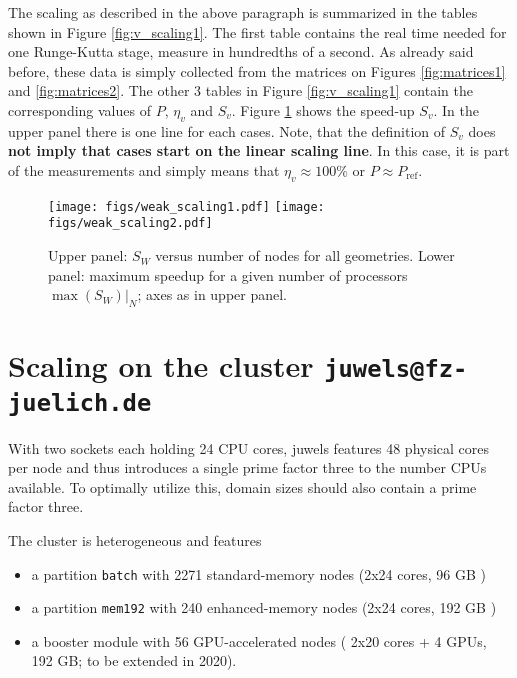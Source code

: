The scaling as described in the above paragraph is summarized in the tables
shown in Figure \ref{fig:v_scaling1}. The first table contains the real time
needed for one Runge-Kutta stage, measure in hundredths of a second. As already
said before, these data is simply collected from the matrices on
Figures \ref{fig:matrices1} and \ref{fig:matrices2}. The other 3 tables in
Figure \ref{fig:v_scaling1} contain the corresponding values of $P$, $\eta_v$
and $S_v$.  Figure \ref{fig:v_scaling2} shows the speed-up $S_v$. In the upper
panel there is one line for each cases.  Note, that the definition of $S_v$
does \textbf{not imply that cases start on the linear scaling line}. In this
case, it is part of the measurements and simply means that $\eta_v\approx 100\%$
or $P\approx P_\mathrm{ref}$.

\begin{figure}
  \begin{centering}
  \texttt{[image: figs/weak\_scaling1.pdf]}%
  \texttt{[image: figs/weak\_scaling2.pdf]}\\
  \end{centering}
  \caption{Upper panel: $S_W$ versus number of nodes for all geometries. Lower
    panel: maximum speedup for a given number of processors $\max(S_W)|_N$; axes
    as in upper panel.  }
  \label{fig:v_scaling2} 
\end{figure}


\section{Scaling on the cluster \texttt{juwels@fz-juelich.de}} 

With two sockets each holding 24 CPU cores, juwels features 48 physical cores per node and thus 
introduces a single prime factor three to the number CPUs available. To optimally utilize this, 
domain sizes should also contain a prime factor three. 

The cluster is heterogeneous and features
\begin{itemize} 
  \item[(1)] a partition \texttt{batch} with 2271 standard-memory nodes (2x24 cores, 96 GB )
  \item[(2)] a partition \texttt{mem192} with 240 enhanced-memory nodes (2x24 cores, 192 GB )
  \item[(3)] a booster module with 56 GPU-accelerated nodes ( 2x20 cores + 4 GPUs, 192 GB; to be extended in 2020).
\end{itemize}


